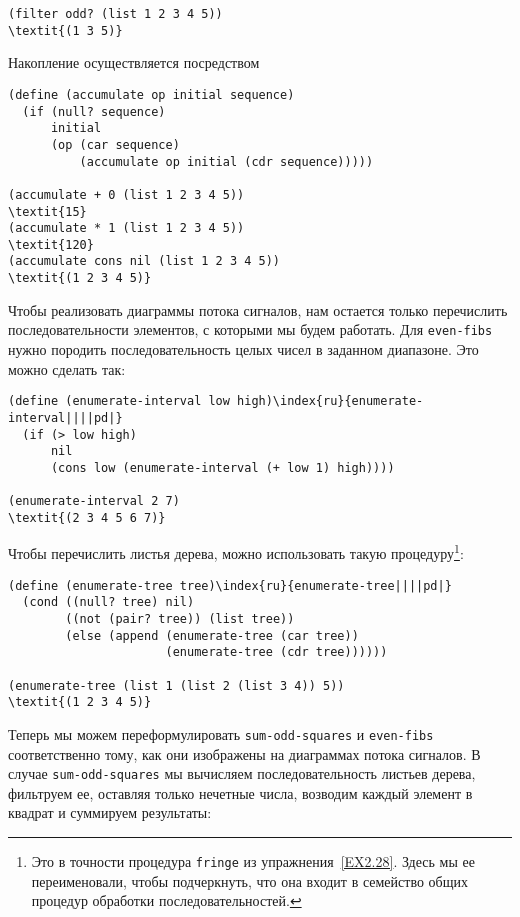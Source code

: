 \begin{Verbatim}[fontsize=\small]
(filter odd? (list 1 2 3 4 5))
\textit{(1 3 5)}
\end{Verbatim}

Накопление осуществляется посредством

\begin{Verbatim}[fontsize=\small]
(define (accumulate op initial sequence)
  (if (null? sequence)
      initial
      (op (car sequence)
          (accumulate op initial (cdr sequence)))))

(accumulate + 0 (list 1 2 3 4 5))
\textit{15}
(accumulate * 1 (list 1 2 3 4 5))
\textit{120}
(accumulate cons nil (list 1 2 3 4 5))
\textit{(1 2 3 4 5)}
\end{Verbatim}

Чтобы реализовать диаграммы потока сигналов, нам остается
только перечислить последовательности элементов, с которыми
мы будем работать. Для {\tt even-fibs} нужно породить
последовательность целых чисел в заданном диапазоне. Это можно сделать 
так:

\begin{Verbatim}[fontsize=\small]
(define (enumerate-interval low high)\index{ru}{enumerate-interval||||pd|}
  (if (> low high)
      nil
      (cons low (enumerate-interval (+ low 1) high))))

(enumerate-interval 2 7)
\textit{(2 3 4 5 6 7)}
\end{Verbatim}
Чтобы перечислить листья дерева, можно использовать
такую процедуру\footnote{Это в точности процедура {\tt fringe} 
из упражнения~\ref{EX2.28}. Здесь мы ее переименовали, чтобы
подчеркнуть, что она входит в семейство общих процедур обработки
последовательностей.}:

\begin{Verbatim}[fontsize=\small]
(define (enumerate-tree tree)\index{ru}{enumerate-tree||||pd|}
  (cond ((null? tree) nil)
        ((not (pair? tree)) (list tree))
        (else (append (enumerate-tree (car tree))
                      (enumerate-tree (cdr tree))))))

(enumerate-tree (list 1 (list 2 (list 3 4)) 5))
\textit{(1 2 3 4 5)}
\end{Verbatim}

Теперь мы можем переформулировать
{\tt sum-odd-squares} и {\tt even-fibs} соответственно
тому, как они 
изображены на диаграммах потока сигналов. В случае
{\tt sum-odd-squares} мы вычисляем последовательность листьев
дерева, фильтруем ее, оставляя только нечетные числа, возводим каждый
элемент в квадрат и суммируем результаты:

